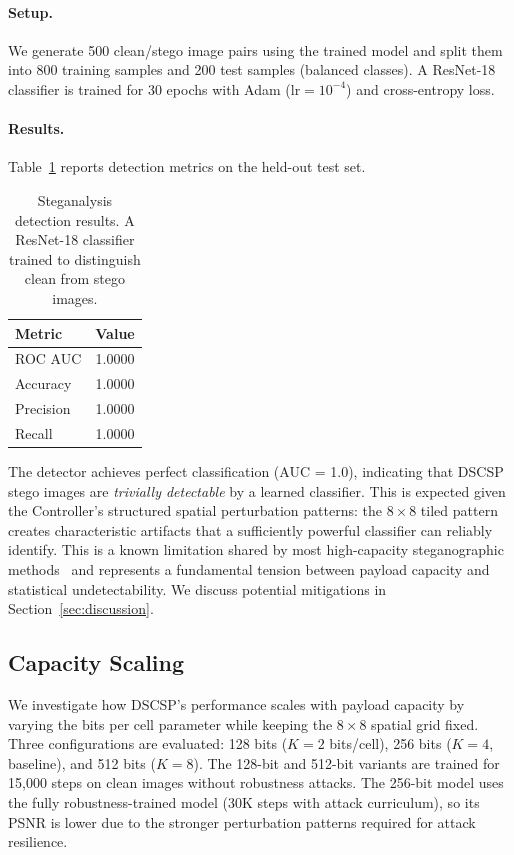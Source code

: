 \documentclass[10pt, twocolumn]{article}
\begin{document}
\paragraph{Setup.}
We generate 500 clean/stego image pairs using the trained model and split them into 800 training samples and 200 test samples (balanced classes).
A ResNet-18~\cite{he2016deep} classifier is trained for 30 epochs with Adam ($\text{lr} = 10^{-4}$) and cross-entropy loss.

\paragraph{Results.}
Table~\ref{tab:steganalysis} reports detection metrics on the held-out test set.

\begin{table}[t]
\centering
\caption{Steganalysis detection results. A ResNet-18 classifier trained to distinguish clean from stego images.}
\label{tab:steganalysis}
\begin{tabular}{@{}lc@{}}
\toprule
\textbf{Metric} & \textbf{Value} \\
\midrule
ROC AUC    & 1.0000 \\
Accuracy   & 1.0000 \\
Precision  & 1.0000 \\
Recall     & 1.0000 \\
\bottomrule
\end{tabular}
\end{table}

The detector achieves perfect classification (AUC = 1.0), indicating that DSCSP stego images are \emph{trivially detectable} by a learned classifier.
This is expected given the Controller's structured spatial perturbation patterns: the $8 \times 8$ tiled pattern creates characteristic artifacts that a sufficiently powerful classifier can reliably identify.
This is a known limitation shared by most high-capacity steganographic methods~\cite{boroumand2019deep} and represents a fundamental tension between payload capacity and statistical undetectability.
We discuss potential mitigations in Section~\ref{sec:discussion}.


\subsection{Capacity Scaling}
\label{sec:scaling}

We investigate how DSCSP's performance scales with payload capacity by varying the bits per cell parameter while keeping the $8 \times 8$ spatial grid fixed.
Three configurations are evaluated: 128 bits ($K=2$ bits/cell), 256 bits ($K=4$, baseline), and 512 bits ($K=8$).
The 128-bit and 512-bit variants are trained for 15{,}000 steps on clean images without robustness attacks.
The 256-bit model uses the fully robustness-trained model (30K steps with attack curriculum), so its PSNR is lower due to the stronger perturbation patterns required for attack resilience.
\end{document}
